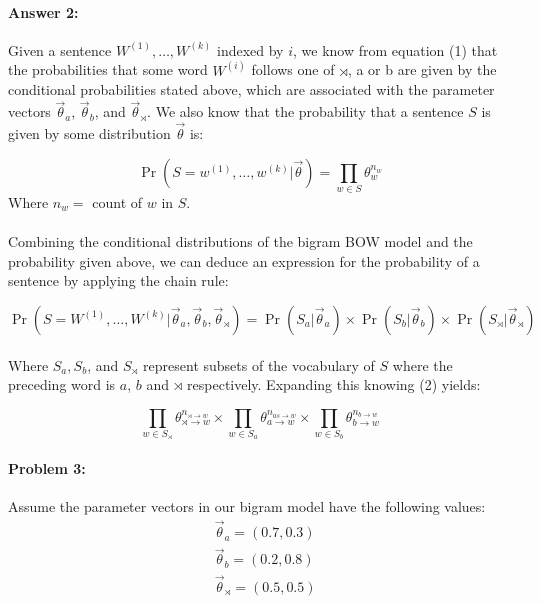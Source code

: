 \documentclass[10pt]{article}
\begin{document}
\paragraph{Answer 2:} Given a sentence  $W^{(1)},\dots,W^{(k)}$ indexed by $i$, we know from equation (1) that the probabilities that some word $W^{(i)}$ follows one of $\rtimes$, a or b are given by the conditional probabilities stated above, which are associated with the parameter
vectors $\vec{\theta}_{a}$, $\vec{\theta}_{b}$, and
$\vec{\theta}_{\rtimes}$. We also know that the probability that a sentence $S$ is given by some distribution $\vec{\theta}$ is: 

\begin{equation}
\Pr(S= w^{(1)}, \dots, w^{(k)}|\vec{\theta}) = \prod_{w\in S}{\theta}_{w}^{n_w}
\end{equation}
Where $n_w = $ count of $w$ in $S$.
\\
\\
Combining the conditional distributions of the bigram BOW model and the probability given above, we can deduce an expression for the probability of a sentence by applying the chain rule:

\begin{equation*}
\Pr(S = W^{(1)},\dots,W^{(k)} | \vec{\theta}_{a}, \vec{\theta}_{b}, \vec{\theta}_{\rtimes}) = \Pr(S_a|\vec{\theta}_a) \times \Pr(S_b|\vec{\theta}_b) \times \Pr( S_\rtimes | \vec{\theta}_{\rtimes}) \end{equation*}
\\
Where $S_a, S_b$, and $S_{\rtimes}$ represent subsets of the vocabulary of $S$ where the preceding word is $a$, $b$ and $\rtimes$ respectively. Expanding this knowing (2) yields:

\begin{equation}
\prod_{w\in S_{\rtimes}}{\theta}_{\rtimes \rightarrow w}^{n_{\rtimes \rightarrow w}} \times  \prod_{w\in S_a}{\theta}_{a \rightarrow w}^{n_{as \rightarrow w}} \times \prod_{w\in S_b} {\theta}_{b \rightarrow w}^{n_{b \rightarrow w}}
\end{equation}

\hrulefill
\paragraph{Problem 3:}


Assume the parameter vectors in our bigram model have the following values:
\begin{align*}
&\vec{\theta}_{a} = (0.7,0.3)\\
&\vec{\theta}_{b} = (0.2,0.8)\\
&\vec{\theta}_{\rtimes} = (0.5,0.5)
\end{align*}
\end{document}
